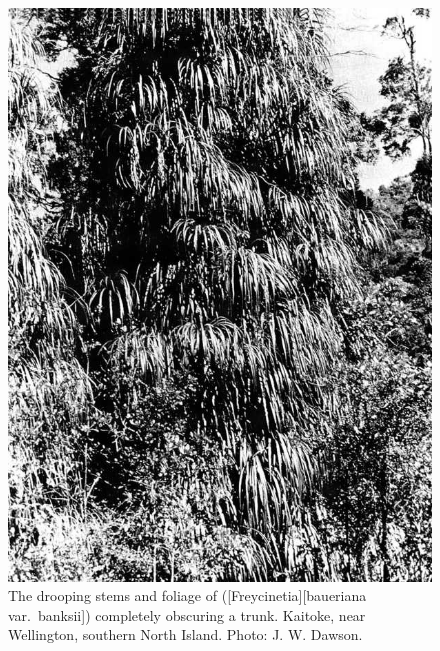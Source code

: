 \begin{figure}[t]
	\begin{minipage}[t]{\textwidth}
		\begin{minipage}[t]{(\textwidth-\fgap) * \real{0.512}}
			\centering
			\includegraphics[width=\textwidth]{graphics/figure32kiekie.jpg}
			\caption[The drooping stems and foliage of kiekie]{The drooping stems and foliage of  ([Freycinetia][baueriana var.\ banksii]) completely obscuring a  trunk. Kaitoke, near Wellington, southern North Island. Photo: J. W. Dawson.}%
			\label{fig:32kiekie}
		\end{minipage}\hspace{\fgap}%
		\begin{minipage}[t]{(\textwidth-\fgap) * \real{0.488}}
			\centering

\end{minipage}
\end{minipage}
\end{figure}
